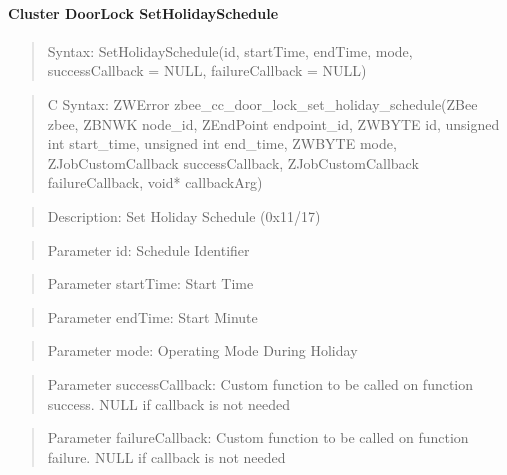 \paragraph{Cluster DoorLock SetHolidaySchedule}
\begin{quote}Syntax: SetHolidaySchedule(id, startTime, endTime, mode, successCallback = NULL, failureCallback = NULL)\end{quote}
\begin{quote}C Syntax: ZWError zbee\_cc\_door\_lock\_set\_holiday\_schedule(ZBee zbee, ZBNWK node\_id, ZEndPoint endpoint\_id, ZWBYTE id, unsigned int start\_time, unsigned int end\_time, ZWBYTE mode, ZJobCustomCallback successCallback, ZJobCustomCallback failureCallback, void* callbackArg)\end{quote}
\begin{quote}Description: Set Holiday Schedule (0x11/17)\end{quote}
\begin{quote}Parameter id: Schedule Identifier\end{quote}
\begin{quote}Parameter startTime: Start Time\end{quote}
\begin{quote}Parameter endTime: Start Minute\end{quote}
\begin{quote}Parameter mode: Operating Mode During Holiday\end{quote}
\begin{quote}Parameter successCallback: Custom function to be called on function success. NULL if callback is not needed\end{quote}
\begin{quote}Parameter failureCallback: Custom function to be called on function failure. NULL if callback is not needed\end{quote}


